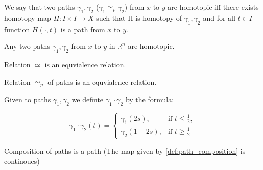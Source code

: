     \begin{definition}
        \label{def:path_homotopy}

        We say that two paths $\gamma_1, \gamma_2$ ($\gamma_1 \simeq_p \gamma_2$) from $x$ to $y$ are homotopic iff there exists homotopy map $H : I \times I \to X$
        such that H is homotopy of $\gamma_1, \gamma_2$ and for all $t \in I$ function $H(\cdot, t)$ is a path from $x$ to $y$.
    \end{definition}

    \begin{lemma}
        \label{lem:Rn_path_equiv_lemma}

        Any two paths $\gamma_1, \gamma_2$ from $x$ to $y$ in $\mathbb{R}^n$ are homotopic.
    \end{lemma}

    \begin{theorem}
        \label{thm:homotopy_equiv}

        Relation $\simeq$ is an equvialence relation.
    \end{theorem}

    \begin{theorem}
        \label{thm:path_homotopy_equiv}

        Relation $\simeq_p$ of paths is an equvialence relation.
    \end{theorem}

    \begin{definition}
        \label{def:path_composition}

        Given to paths $\gamma_1, \gamma_2$ we definte $\gamma_1 \cdot \gamma_2$ by the formula:

        $$
            \gamma_1 \cdot \gamma_2 (t) =
            \begin{cases}
            \gamma_1(2s), & \text{if } t \leq \frac{1}{2}, \\
            \gamma_2(1-2s), & \text{if } t \geq \frac{1}{2}
            \end{cases}
        $$
    \end{definition}

    \begin{lemma}
        \label{lem:path_comp_path}

        Composition of paths is a path (The map given by \ref{def:path_composition} is continoues) 
    \end{lemma}

